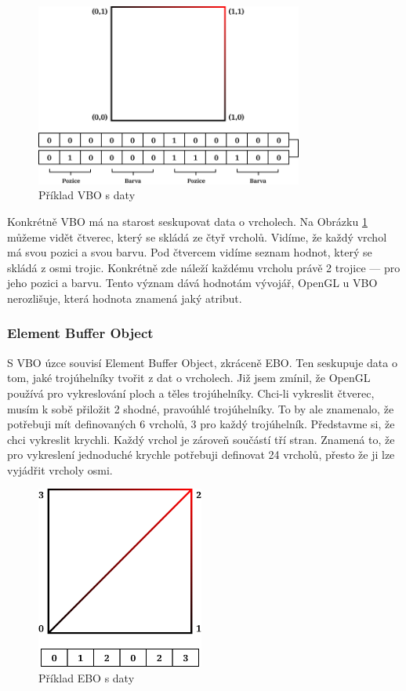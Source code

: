\documentclass[12pt]{article}
\begin{document}
\vspace{0.5cm}
\begin{figure}[h]
    \centering
    \includegraphics[height=6cm]{vbo.png}
    \caption{Příklad VBO s daty}
    \label{fig:Příklad VBO s daty}
\end{figure}

Konkrétně VBO má na starost seskupovat data o vrcholech. Na Obrázku \ref{fig:Příklad VBO s daty} můžeme vidět čtverec, který se skládá ze čtyř vrcholů. Vidíme, že každý vrchol má svou pozici a svou barvu. Pod čtvercem vidíme seznam hodnot, který se skládá z osmi trojic. Konkrétně zde náleží každému vrcholu právě 2 trojice — pro jeho pozici a barvu. Tento význam dává hodnotám vývojář, OpenGL u VBO nerozlišuje, která hodnota znamená jaký atribut.

\subsubsection{Element Buffer Object}

S VBO úzce souvisí Element Buffer Object, zkráceně EBO. Ten seskupuje data o tom, jaké trojúhelníky tvořit z dat o vrcholech. Již jsem zmínil, že OpenGL používá pro vykreslování ploch a těles trojúhelníky. Chci-li vykreslit čtverec, musím k sobě přiložit 2 shodné, pravoúhlé trojúhelníky. To by ale znamenalo, že potřebuji mít definovaných 6 vrcholů, 3 pro každý trojúhelník. Představme si, že chci vykreslit krychli. Každý vrchol je zároveň součástí tří stran. Znamená to, že pro vykreslení jednoduché krychle potřebuji definovat 24 vrcholů, přesto že ji lze vyjádřit vrcholy osmi. \cite{vao_vbo_ebo}

\vspace{0.5cm}
\begin{figure}[h]
    \centering
    \includegraphics[height=6cm]{ebo.png}
    \caption{Příklad EBO s daty}
    \label{fig:Příklad EBO s daty}
\end{figure}
\end{document}
